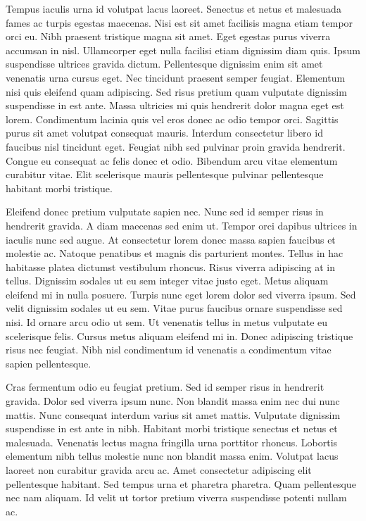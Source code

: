 \documentclass[
]{tufte-pandoc}
\begin{document}
Tempus iaculis urna id volutpat lacus laoreet. Senectus et netus et
malesuada fames ac turpis egestas maecenas. Nisi est sit amet facilisis
magna etiam tempor orci eu. Nibh praesent tristique magna sit amet. Eget
egestas purus viverra accumsan in nisl. Ullamcorper eget nulla facilisi
etiam dignissim diam quis. Ipsum suspendisse ultrices gravida dictum.
Pellentesque dignissim enim sit amet venenatis urna cursus eget. Nec
tincidunt praesent semper feugiat. Elementum nisi quis eleifend quam
adipiscing. Sed risus pretium quam vulputate dignissim suspendisse in
est ante. Massa ultricies mi quis hendrerit dolor magna eget est lorem.
Condimentum lacinia quis vel eros donec ac odio tempor orci. Sagittis
purus sit amet volutpat consequat mauris. Interdum consectetur libero id
faucibus nisl tincidunt eget. Feugiat nibh sed pulvinar proin gravida
hendrerit. Congue eu consequat ac felis donec et odio. Bibendum arcu
vitae elementum curabitur vitae. Elit scelerisque mauris pellentesque
pulvinar pellentesque habitant morbi tristique.

Eleifend donec pretium vulputate sapien nec. Nunc sed id semper risus in
hendrerit gravida. A diam maecenas sed enim ut. Tempor orci dapibus
ultrices in iaculis nunc sed augue. At consectetur lorem donec massa
sapien faucibus et molestie ac. Natoque penatibus et magnis dis
parturient montes. Tellus in hac habitasse platea dictumst vestibulum
rhoncus. Risus viverra adipiscing at in tellus. Dignissim sodales ut eu
sem integer vitae justo eget. Metus aliquam eleifend mi in nulla
posuere. Turpis nunc eget lorem dolor sed viverra ipsum. Sed velit
dignissim sodales ut eu sem. Vitae purus faucibus ornare suspendisse sed
nisi. Id ornare arcu odio ut sem. Ut venenatis tellus in metus vulputate
eu scelerisque felis. Cursus metus aliquam eleifend mi in. Donec
adipiscing tristique risus nec feugiat. Nibh nisl condimentum id
venenatis a condimentum vitae sapien pellentesque.

Cras fermentum odio eu feugiat pretium. Sed id semper risus in hendrerit
gravida. Dolor sed viverra ipsum nunc. Non blandit massa enim nec dui
nunc mattis. Nunc consequat interdum varius sit amet mattis. Vulputate
dignissim suspendisse in est ante in nibh. Habitant morbi tristique
senectus et netus et malesuada. Venenatis lectus magna fringilla urna
porttitor rhoncus. Lobortis elementum nibh tellus molestie nunc non
blandit massa enim. Volutpat lacus laoreet non curabitur gravida arcu
ac. Amet consectetur adipiscing elit pellentesque habitant. Sed tempus
urna et pharetra pharetra. Quam pellentesque nec nam aliquam. Id velit
ut tortor pretium viverra suspendisse potenti nullam ac.
\end{document}
